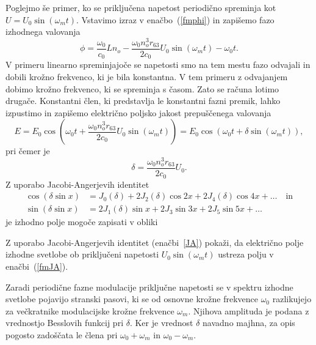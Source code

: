 Poglejmo še primer, ko se priključena napetost periodično spreminja kot
$U=U_{0}\sin(\omega_{m}t)$.
Vstavimo izraz v enačbo~(\ref{fmphi}) in zapišemo fazo izhodnega valovanja 
\begin{equation}
\phi = \frac{\omega_0}{c_0}L n_o - \frac{\omega_0 n_o^3 r_{63}}{2c_0} U_0\sin(\omega_{m}t)
- \omega_0 t.
\end{equation}
V primeru linearno spreminjajoče se napetosti smo na tem mestu fazo odvajali in dobili krožno frekvenco, ki 
je bila konstantna. V tem primeru z odvajanjem dobimo krožno frekvenco, ki se spreminja s časom. Zato
se računa lotimo drugače. Konstantni člen, ki predstavlja le konstantni fazni premik, 
lahko izpustimo in zapišemo električno poljsko jakost prepuščenega valovanja  
\begin{equation}
E = E_0 \cos\left( \omega_0 t + \frac{\omega_0 n_o^3 r_{63}}{2c_0} U_0\sin(\omega_{m}t)\right)
= E_0 \cos\left( \omega_0 t + \delta \sin(\omega_{m}t)\right),
\end{equation}
pri čemer je
\begin{equation}
\delta = \frac{\omega_0 n_o^3 r_{63}}{2c_0} U_0.
\end{equation}
Z uporabo Jacobi-Angerjevih identitet 
\begin{align}
\cos\left(\delta\sin x\right)  &=J_0(\delta)+2J_2(\delta)\cos2x+
2J_4(\delta)\cos4x + \ldots\nonumber \quad \mathrm{in}\\
\sin\left(\delta\sin x\right) &=2J_1(\delta)\sin x+2J_3\sin3x+
2J_5\sin5x+\ldots
\label{JA}
\end{align}
je izhodno polje mogoče zapisati v obliki 
\begin{naloga}
Z uporabo Jacobi-Angerjevih identitet (enačbi~\ref{JA}) pokaži, da električno polje
izhodne svetlobe ob priključeni napetosti $U_0\sin(\omega_{m}t)$ ustreza
polju v enačbi~(\ref{fmJA}).
\end{naloga}
Zaradi periodične fazne modulacije priključne napetosti se v spektru izhodne svetlobe pojavijo stranski pasovi, ki se
od osnovne krožne frekvence $\omega_0$ razlikujejo za večkratnike modulacijske krožne frekvence $\omega_m$. 
Njihova amplituda je podana z vrednostjo Besslovih funkcij pri $\delta$.
Ker je vrednost $\delta$ navadno majhna, za opis pogosto zadoščata le člena pri $\omega_0+\omega_m$ in 
$\omega_0-\omega_m$.

